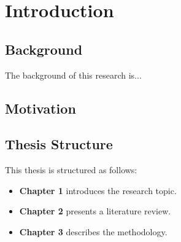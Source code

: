 \chapter{Introduction}

\section{Background}
The background of this research is...

\section{Motivation}


\section{Thesis Structure}
This thesis is structured as follows:
\begin{itemize}
    \item \textbf{Chapter 1} introduces the research topic.
    \item \textbf{Chapter 2} presents a literature review.
    \item \textbf{Chapter 3} describes the methodology.
\end{itemize}
